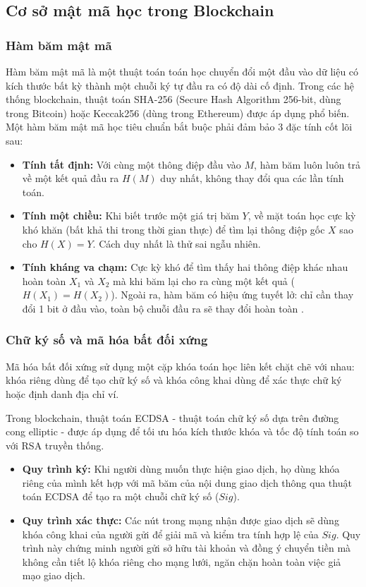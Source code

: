 \documentclass[12pt,a4paper]{article}
\begin{document}
\subsection{Cơ sở mật mã học trong Blockchain}

\subsubsection{Hàm băm mật mã}
Hàm băm mật mã là một thuật toán toán học chuyển đổi một đầu vào dữ liệu có kích thước bất kỳ thành một chuỗi ký tự đầu ra có độ dài cố định. Trong các hệ thống blockchain, thuật toán SHA-256 (Secure Hash Algorithm 256-bit, dùng trong Bitcoin) hoặc Keccak256 (dùng trong Ethereum) được áp dụng phổ biến. Một hàm băm mật mã học tiêu chuẩn bắt buộc phải đảm bảo 3 đặc tính cốt lõi sau:
\begin{itemize}
    \item \textbf{Tính tất định:} Với cùng một thông điệp đầu vào $M$, hàm băm luôn luôn trả về một kết quả đầu ra $H(M)$ duy nhất, không thay đổi qua các lần tính toán.
    \item \textbf{Tính một chiều:} Khi biết trước một giá trị băm $Y$, về mặt toán học cực kỳ khó khăn (bất khả thi trong thời gian thực) để tìm lại thông điệp gốc $X$ sao cho $H(X) = Y$. Cách duy nhất là thử sai ngẫu nhiên.
    \item \textbf{Tính kháng va chạm:} Cực kỳ khó để tìm thấy hai thông điệp khác nhau hoàn toàn $X_1$ và $X_2$ mà khi băm lại cho ra cùng một kết quả ($H(X_1) = H(X_2)$). Ngoài ra, hàm băm có hiệu ứng tuyết lở: chỉ cần thay đổi 1 bit ở đầu vào, toàn bộ chuỗi đầu ra sẽ thay đổi hoàn toàn \cite{stallings}.
\end{itemize}

\subsubsection{Chữ ký số và mã hóa bất đối xứng}
Mã hóa bất đối xứng sử dụng một cặp khóa toán học liên kết chặt chẽ với nhau: khóa riêng dùng để tạo chữ ký số và khóa công khai dùng để xác thực chữ ký hoặc định danh địa chỉ ví.

Trong blockchain, thuật toán ECDSA - thuật toán chữ ký số dựa trên đường cong elliptic - được áp dụng để tối ưu hóa kích thước khóa và tốc độ tính toán so với RSA truyền thống.
\begin{itemize}
    \item \textbf{Quy trình ký:} Khi người dùng muốn thực hiện giao dịch, họ dùng khóa riêng của mình kết hợp với mã băm của nội dung giao dịch thông qua thuật toán ECDSA để tạo ra một chuỗi chữ ký số ($Sig$).
    \item \textbf{Quy trình xác thực:} Các nút trong mạng nhận được giao dịch sẽ dùng khóa công khai của người gửi để giải mã và kiểm tra tính hợp lệ của $Sig$. Quy trình này chứng minh người gửi sở hữu tài khoản và đồng ý chuyển tiền mà không cần tiết lộ khóa riêng cho mạng lưới, ngăn chặn hoàn toàn việc giả mạo giao dịch.
\end{itemize}
\newpage
\end{document}
